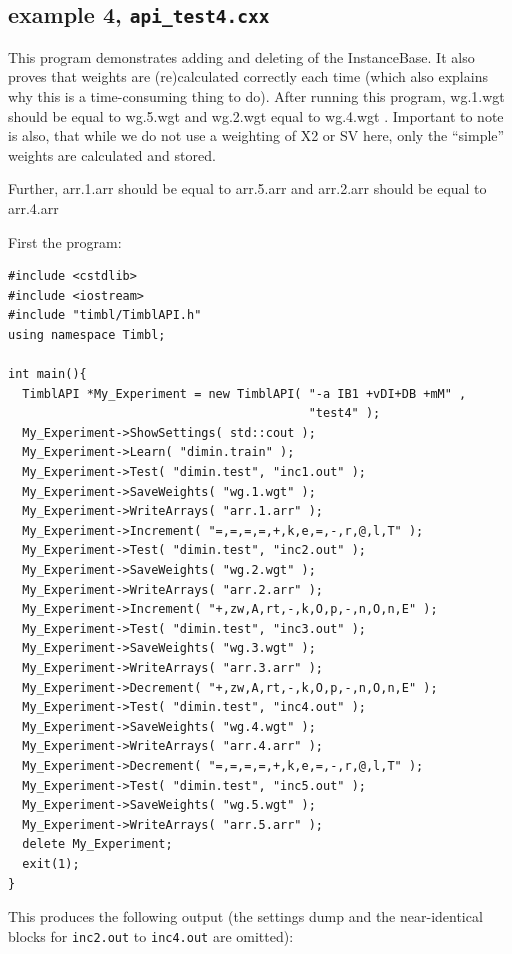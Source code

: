 \documentclass{report}
\begin{document}
\subsection{example 4, {\tt api\_test4.cxx}}

This program demonstrates adding and deleting of the InstanceBase.  It
also proves that weights are (re)calculated correctly each time (which
also explains why this is a time-consuming thing to do). After running
this program, wg.1.wgt should be equal to wg.5.wgt and wg.2.wgt equal to
wg.4.wgt . Important to note is also, that while we do not use a weighting
of X2 or SV here, only the ``simple'' weights are calculated and
stored.

Further, arr.1.arr should be equal to arr.5.arr and arr.2.arr should be equal
to arr.4.arr

First the program:

\begin{footnotesize}
\begin{verbatim}
#include <cstdlib>
#include <iostream>
#include "timbl/TimblAPI.h"
using namespace Timbl;

int main(){
  TimblAPI *My_Experiment = new TimblAPI( "-a IB1 +vDI+DB +mM" ,
                                          "test4" );
  My_Experiment->ShowSettings( std::cout );
  My_Experiment->Learn( "dimin.train" );
  My_Experiment->Test( "dimin.test", "inc1.out" );
  My_Experiment->SaveWeights( "wg.1.wgt" );
  My_Experiment->WriteArrays( "arr.1.arr" );
  My_Experiment->Increment( "=,=,=,=,+,k,e,=,-,r,@,l,T" );
  My_Experiment->Test( "dimin.test", "inc2.out" );
  My_Experiment->SaveWeights( "wg.2.wgt" );
  My_Experiment->WriteArrays( "arr.2.arr" );
  My_Experiment->Increment( "+,zw,A,rt,-,k,O,p,-,n,O,n,E" );
  My_Experiment->Test( "dimin.test", "inc3.out" );
  My_Experiment->SaveWeights( "wg.3.wgt" );
  My_Experiment->WriteArrays( "arr.3.arr" );
  My_Experiment->Decrement( "+,zw,A,rt,-,k,O,p,-,n,O,n,E" );
  My_Experiment->Test( "dimin.test", "inc4.out" );
  My_Experiment->SaveWeights( "wg.4.wgt" );
  My_Experiment->WriteArrays( "arr.4.arr" );
  My_Experiment->Decrement( "=,=,=,=,+,k,e,=,-,r,@,l,T" );
  My_Experiment->Test( "dimin.test", "inc5.out" );
  My_Experiment->SaveWeights( "wg.5.wgt" );
  My_Experiment->WriteArrays( "arr.5.arr" );
  delete My_Experiment;
  exit(1);
}
\end{verbatim}
\end{footnotesize}


This produces the following output (the settings dump and the
near-identical blocks for {\tt inc2.out} to {\tt inc4.out} are
omitted):
\end{document}
